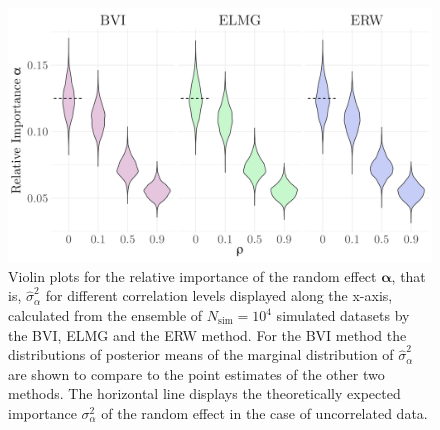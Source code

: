 \begin{figure}[ht]
  \centering
  \includegraphics[width=0.7\linewidth]{Figures/ViolinPlots/Variance_gamma.png}
  \caption[Relative importance of the random effect $\boldsymbol{\alpha}$ in Gaussian LMM]{Violin plots for the relative importance of the random effect $\boldsymbol{\alpha}$, that is, $\hat{\sigma}^2_{\alpha}$ for different correlation levels displayed along the x-axis, calculated from the ensemble of $N_{\text{sim}}=10^4$ simulated datasets by the BVI, ELMG and the ERW method. For the BVI method the distributions of posterior means of the marginal distribution of $\hat{\sigma}^2_{\alpha}$ are shown to compare to the point estimates of the other two methods. The horizontal line displays the theoretically expected importance $\sigma^2_{\alpha}$ of the random effect in the case of uncorrelated data.}
  \label{fig:relimp_alpha}
\end{figure}

